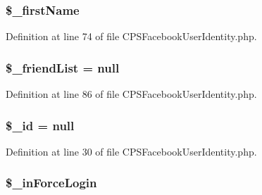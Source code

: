 \hypertarget{classCPSFacebookUserIdentity_ae47bb90ba7f0f5de161e554290d3b5b8}{
\subsubsection[{\$\_\-firstName}]{\setlength{\rightskip}{0pt plus 5cm}\$\_\-firstName}}
\label{classCPSFacebookUserIdentity_ae47bb90ba7f0f5de161e554290d3b5b8}


Definition at line 74 of file CPSFacebookUserIdentity.php.

\hypertarget{classCPSFacebookUserIdentity_a93380830cda99a4927d3507251a12e32}{
\subsubsection[{\$\_\-friendList}]{\setlength{\rightskip}{0pt plus 5cm}\$\_\-friendList = null}}
\label{classCPSFacebookUserIdentity_a93380830cda99a4927d3507251a12e32}


Definition at line 86 of file CPSFacebookUserIdentity.php.

\hypertarget{classCPSFacebookUserIdentity_a64da16c4a1c7b2dc6784f6ef26341ed7}{
\subsubsection[{\$\_\-id}]{\setlength{\rightskip}{0pt plus 5cm}\$\_\-id = null}}
\label{classCPSFacebookUserIdentity_a64da16c4a1c7b2dc6784f6ef26341ed7}


Definition at line 30 of file CPSFacebookUserIdentity.php.

\hypertarget{classCPSFacebookUserIdentity_a425e3b02d08adda9a06498d8e0f5714c}{
\subsubsection[{\$\_\-inForceLogin}]{\setlength{\rightskip}{0pt plus 5cm}\$\_\-inForceLogin}}
\label{classCPSFacebookUserIdentity_a425e3b02d08adda9a06498d8e0f5714c}


